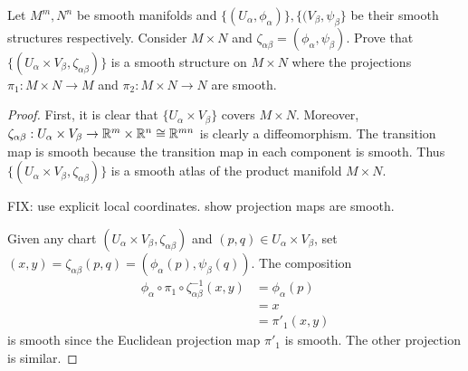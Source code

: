 \documentclass[12pt]{article}
\begin{document}
\begin{problem}[0.1(a)]
	Let $ M^{m},N^{n}$ be smooth manifolds and  $ \{(U_{ \alpha}, \phi_{ \alpha})\}, \{(V_{ \beta}, \psi_{ \beta}\} $ be their smooth structures respectively. Consider $ M \times N$ and $ \zeta_{ \alpha \beta} = (\phi_{ \alpha}, \psi_{ \beta})$. Prove that $ \{(U_{ \alpha} \times V_{ \beta}, \zeta_{ \alpha \beta})\} $ is a smooth structure on $ M \times N$ where the projections $ \pi_1 : M \times N \to M$ and $ \pi_2 : M \times N \to N$ are smooth.
\end{problem}
\begin{proof}
First, it is clear that $ \{U_{ \alpha} \times V_{ \beta}\} $ covers $ M \times N$. Moreover, $ \zeta_{ \alpha \beta} : U_{ \alpha} \times V_{ \beta} \to \mathbb{R}^{m} \times \mathbb{R}^{n} \cong  \mathbb{R}^{mn}$ is clearly a diffeomorphism. The transition map is smooth because the transition map in each component is smooth. Thus $ \{(U_{ \alpha} \times V_{ \beta}, \zeta_{ \alpha \beta})\} $ is a smooth atlas of the product manifold $ M \times N$. 

FIX: use explicit local coordinates. show projection maps are smooth.

Given any chart $ (U_{ \alpha} \times V_{ \beta}, \zeta_{ \alpha \beta})$ and $ (p,q) \in U_{ \alpha} \times V_{ \beta}$, set $ (x,y) = \zeta_{ \alpha \beta}(p,q) = (\phi_{ \alpha}(p), \psi_{ \beta}(q))$. The composition
\begin{align*}
	\phi_{ \alpha} \circ \pi_1 \circ \zeta_{ \alpha \beta}^{-1} (x,y) &= \phi_{ \alpha} (p) \\
	&= x \\
	&= \pi'_1(x,y) 
\end{align*}
is smooth since the Euclidean projection map $ \pi'_1$ is smooth. The other projection is similar.
\end{proof}
\end{document}
